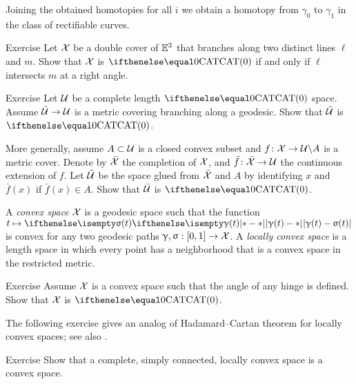 Joining the obtained homotopies for all $i$ we obtain a homotopy from $\gamma_0$ to $\gamma_1$ in the class of rectifiable curves.
\qeds

\begin{thm}{Exercise}\label{ex:cover-branching-along-2-lines}
Let $\mathcal{X}$ be a double cover of $\mathbb{E}^3$ that branches along two distinct lines $\ell$ and $m$.
Show that  $\mathcal{X}$ is $\CAT0$ if and only if $\ell$ intersects $m$ at a right angle.
\end{thm}

\begin{thm}{Exercise}\label{ex:branching}
Let $\mathcal{U}$ be a complete length $\CAT0$ space.
Assume $\tilde{\spc{U}}\to \spc{U}$ is a metric covering branching along a geodesic.
Show that $\tilde{\mathcal{U}}$ is $\CAT0$.

More generally, assume $A\subset \spc{U}$ is a closed convex subset and $f\:\spc{X}\to \spc{U}\backslash A$ is a metric cover.
Denote by $\bar{\mathcal{X}}$ the completion of $\mathcal{X}$, and 
$\bar f\:\bar{\spc{X}}\to \spc{U}$ the continuous extension of $f$.
Let $\tilde{\mathcal{U}}$ be the space glued from $\bar{\mathcal{X}}$ and $A$ by identifying $x$ and $\bar f(x)$ if $\bar f(x)\in A$.
Show that $\tilde{\mathcal{U}}$ is $\CAT0$.
\end{thm}

A \emph{convex space} $\mathcal{X}$ is a geodesic space such that the function
$t\mapsto\dist{\gamma(t)}{\sigma(t)}{}$ is convex 
for any two  geodesic paths $\gamma,\sigma:[0,1]\to \spc{X}$.  
A \emph{locally convex space} is a length space in which every point has a neighborhood that is a convex space in the restricted metric.


\begin{thm}{Exercise}\label{ex:cats-cradle}
Assume $\mathcal{X}$ is a convex space 
such that the angle of any hinge is defined.
Show that $\mathcal{X}$ is $\CAT{0}$.
\end{thm}

The following exercise gives an analog of Hadamard--Cartan theorem for locally convex spaces;
see also \cite{alexander-bishop:h-c}.

\begin{thm}{Exercise}\label{ex:Hadamard--Cartan}
Show that a complete, simply connected, locally convex space is a convex space.
\end{thm}





